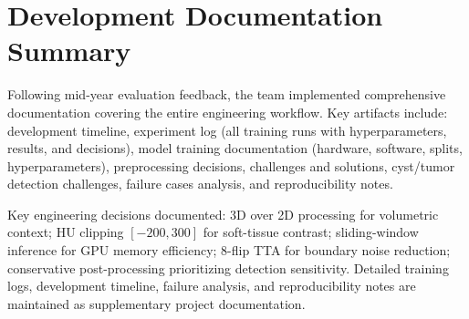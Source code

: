 \section{Development Documentation Summary}

Following mid-year evaluation feedback, the team implemented comprehensive documentation covering the entire engineering workflow. Key artifacts include: development timeline, experiment log (all training runs with hyperparameters, results, and decisions), model training documentation (hardware, software, splits, hyperparameters), preprocessing decisions, challenges and solutions, cyst/tumor detection challenges, failure cases analysis, and reproducibility notes.

Key engineering decisions documented: 3D over 2D processing for volumetric context; HU clipping $[-200, 300]$ for soft-tissue contrast; sliding-window inference for GPU memory efficiency; 8-flip TTA for boundary noise reduction; conservative post-processing prioritizing detection sensitivity. Detailed training logs, development timeline, failure analysis, and reproducibility notes are maintained as supplementary project documentation.
